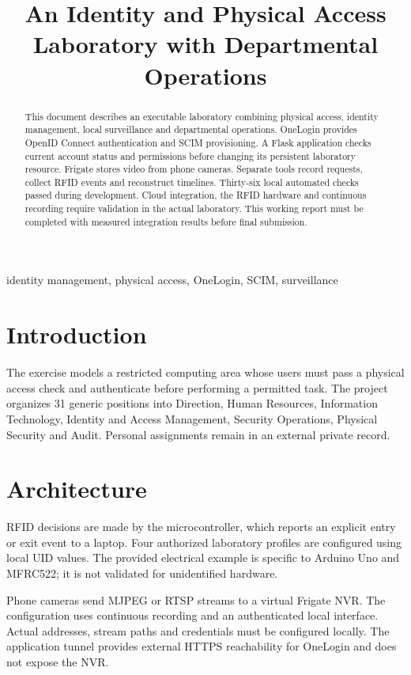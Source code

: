 \documentclass[conference]{IEEEtran}
\title{An Identity and Physical Access Laboratory with Departmental Operations}
\author{\IEEEauthorblockN{Laboratory Team}\IEEEauthorblockA{Generic working copy without personal or institutional information}}
\begin{document}
\maketitle
\begin{abstract}
This document describes an executable laboratory combining physical access, identity management, local surveillance and departmental operations. OneLogin provides OpenID Connect authentication and SCIM provisioning. A Flask application checks current account status and permissions before changing its persistent laboratory resource. Frigate stores video from phone cameras. Separate tools record requests, collect RFID events and reconstruct timelines. Thirty-six local automated checks passed during development. Cloud integration, the RFID hardware and continuous recording require validation in the actual laboratory. This working report must be completed with measured integration results before final submission.
\end{abstract}
\begin{IEEEkeywords}
identity management, physical access, OneLogin, SCIM, surveillance
\end{IEEEkeywords}

\section{Introduction}
The exercise models a restricted computing area whose users must pass a physical access check and authenticate before performing a permitted task. The project organizes 31 generic positions into Direction, Human Resources, Information Technology, Identity and Access Management, Security Operations, Physical Security and Audit. Personal assignments remain in an external private record.

\section{Architecture}
RFID decisions are made by the microcontroller, which reports an explicit entry or exit event to a laptop. Four authorized laboratory profiles are configured using local UID values. The provided electrical example is specific to Arduino Uno and MFRC522; it is not validated for unidentified hardware.

Phone cameras send MJPEG or RTSP streams to a virtual Frigate NVR. The configuration uses continuous recording and an authenticated local interface. Actual addresses, stream paths and credentials must be configured locally. The application tunnel provides external HTTPS reachability for OneLogin and does not expose the NVR.
\end{document}
